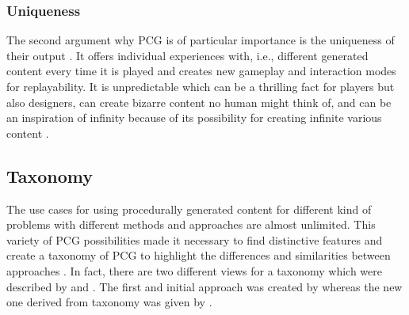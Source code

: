 \documentclass[MGS,Master,english]{twbook}%
\begin{document}
\subsubsection{Uniqueness}
The second argument why PCG is of particular importance is the uniqueness of their output \cite{pcg::inGameDesign}. It offers individual experiences with, i.e., different generated content every time it is played and creates new gameplay and interaction modes for replayability. It is unpredictable which can be a thrilling fact for players but also designers, can create bizarre content no human might think of, and can be an inspiration of infinity because of its possibility for creating infinite various content \cite{pcg::inGameDesign}.


\subsection{Taxonomy}\label{PcgTaxonomy}
The use cases for using procedurally generated content for different kind of problems with different methods and approaches are almost unlimited. This variety of PCG possibilities made it necessary to find distinctive features and create a taxonomy of PCG to highlight the differences and similarities between approaches \cite{pcg::book}. In fact, there are two different views for a taxonomy which were described by \citep{pcg::survey} and \citep{pcg::book}. The first and initial approach was created by \citep{pcg::survey} whereas the new one derived from \citep{pcg::survey} taxonomy was given by \citep{pcg::book}.
\end{document}
